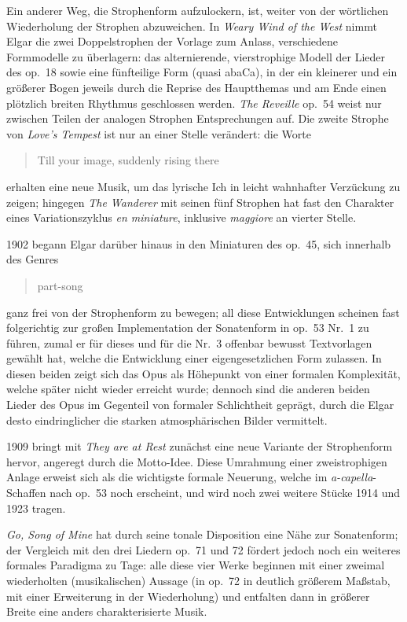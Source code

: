 \documentclass[a4paper,11pt,open=any]{scrbook}
\newcommand{\engquote}[1]{\foreignblockquote{english}{#1}}
\begin{document}
Ein anderer Weg, die Strophenform aufzulockern, ist, weiter von der
wörtlichen Wiederholung der Strophen abzuweichen.  In \textit{Weary Wind
of the West} nimmt Elgar die zwei Doppelstrophen der Vorlage zum Anlass,
verschiedene Formmodelle zu überlagern: das alternierende, vierstrophige
Modell der Lieder des op.~18 sowie eine fünfteilige Form (quasi \textsf{abaCa}),
in der ein kleinerer und ein größerer Bogen jeweils durch die Reprise des
Hauptthemas und am Ende einen plötzlich breiten Rhythmus geschlossen werden.
\textit{The Reveille} op.~54 weist nur zwischen Teilen der analogen Strophen
Entsprechungen auf.  Die zweite Strophe von \textit{Love’s Tempest} ist nur
an einer Stelle verändert: die Worte \engquote{Till your image, suddenly
rising there} erhalten eine neue Musik, um das lyrische Ich in leicht
wahnhafter Verzückung zu zeigen; hingegen \textit{The Wanderer} mit seinen
fünf Strophen hat fast den Charakter eines Variationszyklus \textit{en
miniature}, inklusive \textit{maggiore} an vierter Stelle.

1902 begann Elgar darüber hinaus in den Miniaturen des op.~45, sich innerhalb
des Genres \engquote{part-song} ganz frei von der Strophenform zu bewegen;
all diese Entwicklungen scheinen fast folgerichtig zur großen Implementation
der Sonatenform in op.~53 Nr.~1 zu führen, zumal er für dieses und für die
Nr.~3 offenbar bewusst Textvorlagen gewählt hat, welche die Entwicklung
einer eigengesetzlichen Form zulassen.  In diesen beiden zeigt sich das Opus
als Höhepunkt von einer formalen Komplexität, welche später nicht wieder
erreicht wurde;  dennoch sind die anderen beiden Lieder des Opus im Gegenteil
von formaler Schlichtheit geprägt, durch die Elgar desto eindringlicher die
starken atmosphärischen Bilder vermittelt.

1909 bringt mit \textit{They are at Rest} zunächst eine neue Variante der
Strophenform hervor, angeregt durch die Motto-Idee.  Diese Umrahmung einer
zweistrophigen Anlage erweist sich als die wichtigste formale Neuerung,
welche im \textit{a-capella}-Schaffen nach op.~53 noch erscheint, und wird
noch zwei weitere Stücke 1914 und 1923 tragen.

\textit{Go, Song of Mine} hat durch seine tonale Disposition eine Nähe
zur Sonatenform; der Vergleich mit den drei Liedern op.~71 und 72 fördert
jedoch noch ein weiteres formales Paradigma zu Tage: alle diese vier Werke
beginnen mit einer zweimal wiederholten (musikalischen) Aussage (in op.~72
in deutlich größerem Maßstab, mit einer Erweiterung in der Wiederholung)
und entfalten dann in größerer Breite eine anders charakterisierte Musik.
\end{document}
